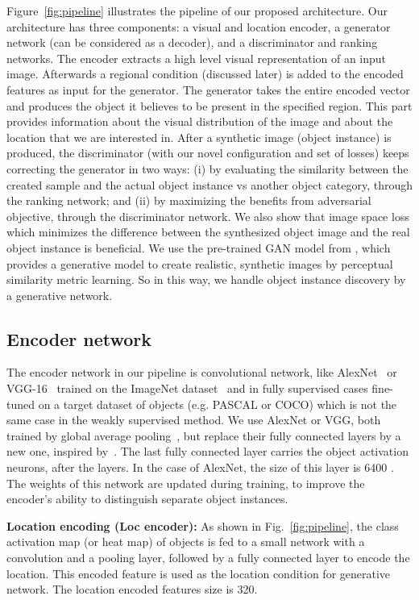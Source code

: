 \documentclass[runningheads]{llncs}
\begin{document}
Figure~\ref{fig:pipeline} illustrates the pipeline of our proposed architecture. Our architecture has three components:  a visual and location encoder,  a generator network (can be considered as a decoder), and  a discriminator and ranking networks. The encoder extracts a high level visual representation of an input image. Afterwards a regional condition (discussed later) is added to the encoded features as input for the generator. The generator takes the entire encoded vector and produces the object it believes to be present in the specified region. This part provides information about the visual distribution of the image and about the location that we are interested in. After a synthetic image (object instance) is produced, the discriminator (with our novel configuration and set of losses) keeps correcting the generator in two ways: (i) by evaluating the similarity between the created sample and the actual object instance vs another object category, through the ranking network; and (ii) by maximizing the benefits from adversarial objective, through the discriminator network. We also show that image space loss which minimizes the difference between the synthesized object image and the real object instance is beneficial. We use the pre-trained GAN model from \cite{dosovitskiy2}, which provides a generative model to create realistic, synthetic images by perceptual similarity metric learning. So in this way, we handle object instance discovery by a generative network.

\subsection{Encoder network}
The encoder network in our pipeline is convolutional network, like AlexNet~\cite{alexnet} or VGG-16~\cite{vgg} trained on the ImageNet dataset~\cite{imagenet} and in fully supervised cases fine-tuned on a target dataset of objects (e.g. PASCAL or COCO) which is not the same case in the weakly supervised method. We use AlexNet or VGG, both trained by global average pooling~\cite{gap}, but replace their fully connected layers by a new one, inspired by~\cite{pathak}. The last fully connected layer carries the object activation neurons, after the  layers. In the case of AlexNet, the size of this layer is 6400 . The weights of this network are updated during training, to improve the encoder's ability to distinguish separate object instances.

\textbf{Location encoding (Loc encoder):}
As shown in Fig.~\ref{fig:pipeline}, the class activation map (or heat map) of objects is fed to a small network with a convolution and a pooling layer, followed by a fully connected layer to encode the location. This encoded feature is used as the location condition for generative network. The location encoded features size is 320.
 
\end{document}
